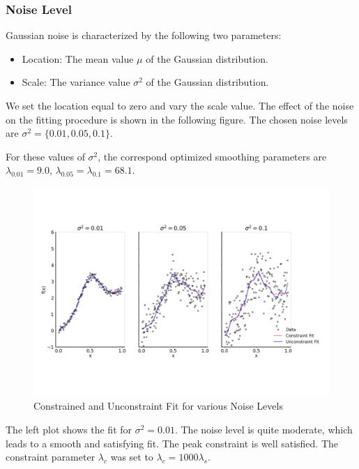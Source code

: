 \documentclass[10pt,a4paper]{article}
\begin{document}
\subsubsection{Noise Level}

Gaussian noise is characterized by the following two parameters:
\begin{itemize}
	\item Location: The mean value $\mu$ of the Gaussian distribution.
	\item Scale: The variance value $\sigma^2$ of the Gaussian distribution.
\end{itemize}

We set the location equal to zero and vary the scale value. The effect of the noise on the fitting procedure is shown in the following figure. The chosen noise levels are $\sigma^2 = \{0.01, 0.05, 0.1\}$.

For these values of $\sigma^2$, the correspond optimized smoothing parameters are $\lambda_{0.01} = 9.0$, $\lambda_{0.05} = \lambda_{0.1} = 68.1$.

\begin{figure}[H]
	\centering
	\includegraphics[width=\columnwidth]{../thesisplots/exp_noise_levels.pdf}
	\caption{Constrained and Unconstraint Fit for various Noise Levels}
	\label{fig:fit_noise_levels}
\end{figure}

The left plot shows the fit for $\sigma^2 = 0.01$. The noise level is quite moderate, which leads to a smooth and satisfying fit. The peak constraint is well satisfied. The constraint parameter $\lambda_c$ was set to $\lambda_c = 1000\lambda_s$. 
\end{document}
